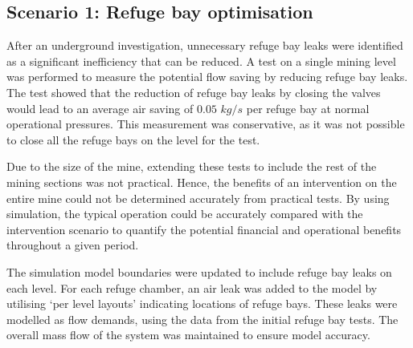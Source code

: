 	\subsection{Scenario 1: Refuge bay optimisation}
	After an underground investigation, unnecessary refuge bay leaks were identified as a significant inefficiency that can be reduced. A test on a single mining level was performed to measure the potential flow saving by reducing refuge bay leaks. The test showed that the reduction of refuge bay leaks by closing the valves would lead to an average air saving of $0.05$ $kg/s$ per refuge bay at normal operational pressures. This measurement was conservative, as it was not possible to close all the refuge bays on the level for the test. 
	\par 
	Due to the size of the mine, extending these tests to include the rest of the mining sections was not practical.  Hence, the benefits of an intervention on the entire mine could not be determined accurately from practical tests. By using simulation, the typical operation could be accurately compared with the intervention scenario to quantify the potential financial and operational benefits throughout a given period.
	\par
	The simulation model boundaries were updated to include refuge bay leaks on each level. For each refuge chamber, an air leak was added to the model by utilising \enquote*{per level layouts} indicating locations of refuge bays. These leaks were modelled as flow demands, using the data from the initial refuge bay tests. The overall mass flow of the system was maintained to ensure model accuracy. 
